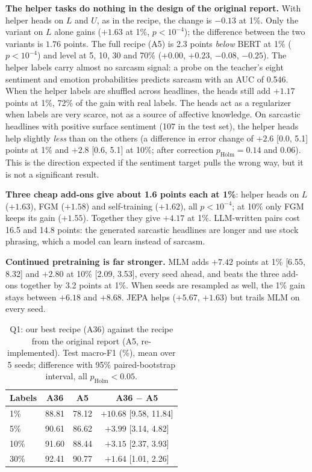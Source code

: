 \documentclass[conference]{IEEEtran}
\newcommand{\A}[1]{\textsf{#1}}                         %
\begin{document}
\textbf{The helper tasks do nothing in the design of the original report.} With helper heads on $L$ and $U$, as in the recipe, the change is $-0.13$ at 1\%. Only the variant on $L$ alone gains ($+1.63$ at 1\%, $p < 10^{-4}$); the difference between the two variants is $1.76$ points. The full recipe (\A{A5}) is 2.3 points \emph{below} BERT at 1\% ($p < 10^{-4}$) and level at 5, 10, 30 and 70\% ($+0.00$, $+0.23$, $-0.08$, $-0.25$). The helper labels carry almost no sarcasm signal: a probe on the teacher's eight sentiment and emotion probabilities predicts sarcasm with an AUC of 0.546. When the helper labels are shuffled across headlines, the heads still add $+1.17$ points at 1\%, 72\% of the gain with real labels. The heads act as a regularizer when labels are very scarce, not as a source of affective knowledge. On sarcastic headlines with positive surface sentiment (107 in the test set), the helper heads help slightly \emph{less} than on the others (a difference in error change of $+2.6$ [0.0, 5.1] points at 1\% and $+2.8$ [0.6, 5.1] at 10\%; after correction $p_{\mathrm{Holm}} = 0.14$ and $0.06$). This is the direction expected if the sentiment target pulls the wrong way, but it is not a significant result.

\textbf{Three cheap add-ons give about 1.6 points each at 1\%}: helper heads on $L$ ($+1.63$), FGM ($+1.58$) and self-training ($+1.62$), all $p < 10^{-4}$; at 10\% only FGM keeps its gain ($+1.55$). Together they give $+4.17$ at 1\%. LLM-written pairs cost 16.5 and 14.8 points: the generated sarcastic headlines are longer and use stock phrasing, which a model can learn instead of sarcasm.

\textbf{Continued pretraining is far stronger.} MLM adds $+7.42$ points at 1\% [6.55, 8.32] and $+2.80$ at 10\% [2.09, 3.53], every seed ahead, and beats the three add-ons together by 3.2 points at 1\%. When seeds are resampled as well, the 1\% gain stays between $+6.18$ and $+8.68$. JEPA helps ($+5.67$, $+1.63$) but trails MLM on every seed.

\begin{table}[t]
\centering
\caption{Q1: our best recipe (\A{A36}) against the recipe from the original report (\A{A5}, re-implemented). Test macro-F1 (\%), mean over 5 seeds; difference with 95\% paired-bootstrap interval, all $p_{\mathrm{Holm}}<0.05$.}
\label{tab:ours}
\footnotesize
\setlength{\tabcolsep}{5pt}
\begin{tabular}{lccc}
\toprule
Labels & \A{A36} & \A{A5} & \A{A36} $-$ \A{A5} \\
\midrule
1\%  & 88.81 & 78.12 & $+10.68$ [9.58, 11.84] \\
5\%  & 90.61 & 86.62 & $+3.99$ [3.14, 4.82] \\
10\% & 91.60 & 88.44 & $+3.15$ [2.37, 3.93] \\
30\% & 92.41 & 90.77 & $+1.64$ [1.01, 2.26] \\
\bottomrule
\end{tabular}
\end{table}
\end{document}
